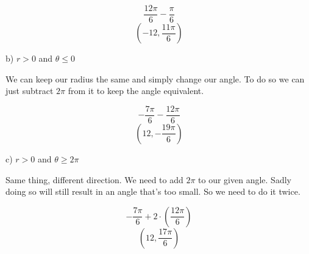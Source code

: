\begin{solution}
        \[\frac{12\pi}{6} - \frac{\pi}{6}\]
        \[\boxed{\left( -12, \frac{11\pi}{6} \right)}\]
        
    b) $r > 0$ and $\theta \leq 0$ \medskip
    
        We can keep our radius the same and simply change our angle. To do so we can just subtract $2\pi$ from it to keep the angle equivalent. 
        
        \[-\frac{7\pi}{6} - \frac{12\pi}{6}\]
        \[\boxed{\left( 12, -\frac{19\pi}{6} \right)}\]
        
    c) $r > 0$ and $\theta \geq 2\pi$ \medskip
        
        Same thing, different direction. We need to add $2\pi$ to our given angle. Sadly doing so will still result in an angle that's too small. So we need to do it twice. 
        
        \[-\frac{7\pi}{6} + 2\cdot \left( \frac{12\pi}{6} \right)\]
        \[\boxed{ \left( 12, \frac{17\pi}{6} \right)  }\]
\end{solution}        
